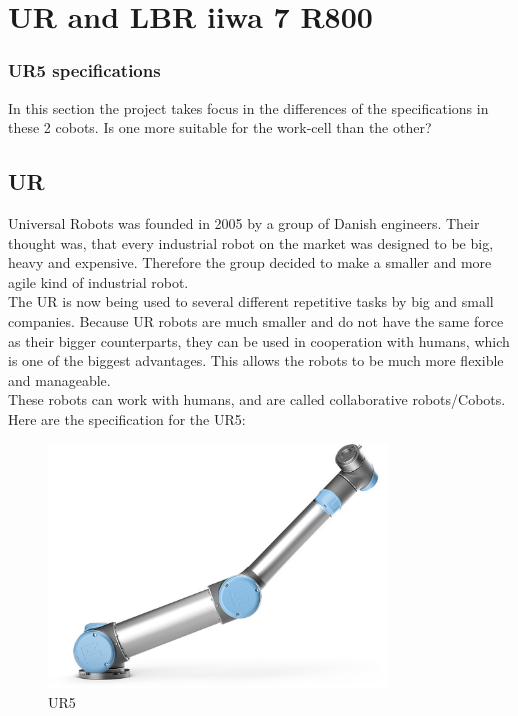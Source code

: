 \section{UR and LBR iiwa 7 R800} \label{ch:UR}
\subsubsection{UR5 specifications}
In this section the project takes focus in the differences of the specifications in these 2 cobots. Is one more suitable for the work-cell than the other?

\subsection{UR}

Universal Robots was founded in 2005 by a group of Danish engineers. Their thought was, that every industrial robot on the market was designed to be big, heavy and expensive. Therefore the group decided to make a smaller and more agile kind of industrial robot.\cite{Urhist}\\


The UR is now being used to several different repetitive tasks by big and small companies.
Because UR robots are much smaller and do not have the same force as their bigger counterparts, they can be used in cooperation with humans, which is one of the biggest advantages. This allows the robots to be much more flexible and manageable.\\



These robots can work with humans, and are called collaborative robots/Cobots.\\
Here are the specification for the UR5:\\ 

\begin{figure}[h]
    \centering
    \includegraphics[width=9cm]{UR/UR5pic.jpg}
    \caption{UR5}
    \label{fig:UR5}
\end{figure}

